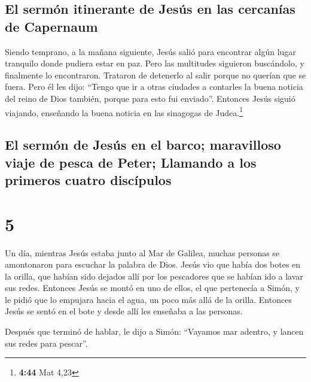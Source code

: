 \hypertarget{el-sermuxf3n-itinerante-de-jesuxfas-en-las-cercanuxedas-de-capernaum}{%
\subsection{El sermón itinerante de Jesús en las cercanías de
Capernaum}\label{el-sermuxf3n-itinerante-de-jesuxfas-en-las-cercanuxedas-de-capernaum}}

 Siendo temprano, a la mañana siguiente, Jesús salió para
encontrar algún lugar tranquilo donde pudiera estar en paz. Pero las
multitudes siguieron buscándolo, y finalmente lo encontraron. Trataron
de detenerlo al salir porque no querían que se fuera. 
Pero él les dijo: ``Tengo que ir a otras ciudades a contarles la buena
noticia del reino de Dios también, porque para esto fui enviado''.
 Entonces Jesús siguió viajando, enseñando la buena
noticia en las sinagogas de Judea.\footnote{\textbf{4:44} Mat 4,23}

\hypertarget{el-sermuxf3n-de-jesuxfas-en-el-barco-maravilloso-viaje-de-pesca-de-peter-llamando-a-los-primeros-cuatro-discuxedpulos}{%
\subsection{El sermón de Jesús en el barco; maravilloso viaje de pesca
de Peter; Llamando a los primeros cuatro
discípulos}\label{el-sermuxf3n-de-jesuxfas-en-el-barco-maravilloso-viaje-de-pesca-de-peter-llamando-a-los-primeros-cuatro-discuxedpulos}}

\hypertarget{section-4}{%
\section{5}\label{section-4}}

 Un día, mientras Jesús estaba junto al Mar de Galilea,
muchas personas se amontonaron para escuchar la palabra de Dios.
 Jesús vio que había dos botes en la orilla, que habían
sido dejados allí por los pescadores que se habían ido a lavar sus
redes.  Entonces Jesús se montó en uno de ellos, el que
pertenecía a Simón, y le pidió que lo empujara hacia el agua, un poco
más allá de la orilla. Entonces Jesús se sentó en el bote y desde allí
les enseñaba a las personas.

 Después que terminó de hablar, le dijo a Simón: ``Vayamos
mar adentro, y lancen sus redes para pescar''.

